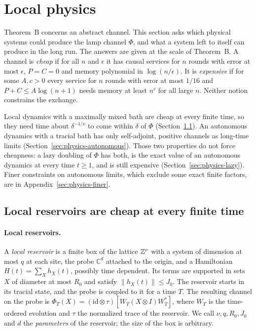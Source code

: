 \section{Local physics}\label{sec:physics}

Theorem~B concerns an abstract channel. This section asks which physical systems could produce the lamp channel $\Phi$, and what a
system left to itself can produce in the long run. The answers are given at the scale of Theorem~B. A channel is \emph{cheap} if for all
$n$ and $\epsilon$ it has causal services for $n$ rounds with error at most $\epsilon$, $P=C=0$ and memory polynomial in $\log(n/\epsilon)$.
It is \emph{expensive} if for some $A,c>0$ every service for $n$ rounds with error at most $1/16$ and $P+C\le A\log(n+1)$ needs memory at
least $n^c$ for all large $n$. Neither notion constrains the exchange.

Local dynamics with a maximally mixed bath are cheap at every finite time, so they need time about $\delta^{-1/\nu}$ to come within
$\delta$ of $\Phi$ (Section~\ref{sec:physics-local}). An autonomous dynamics with a tracial bath has only self-adjoint, positive channels as
long-time limits (Section~\ref{sec:physics-autonomous}). Those two properties do not force cheapness: a lazy doubling of $\Phi$ has both, is
the exact value of an autonomous dynamics at every time $t\ge1$, and is still expensive (Section~\ref{sec:physics-lazy}). Finer constraints
on autonomous limits, which exclude some exact finite factors, are in Appendix~\ref{sec:physics-finer}.

\subsection{Local reservoirs are cheap at every finite time}\label{sec:physics-local}

\paragraph{Local reservoirs.} A \emph{local reservoir} is a finite box of the lattice $\mathbb Z^\nu$ with a system of dimension at most $q$ at each
site, the probe $\mathbb C^d$ attached to the origin, and a Hamiltonian $H(t)=\sum_Xh_X(t)$, possibly time dependent. Its terms are
supported in sets $X$ of diameter at most $R_0$ and satisfy $\|h_X(t)\|\le J_0$. The reservoir starts in its tracial state, and the probe is
coupled to it for a time $T$. The resulting channel on the probe is $\Phi_T(X)=(\mathrm{id}\otimes\tau)[W_T(X\otimes I)W_T^*]$, where $W_T$ is
the time-ordered evolution and $\tau$ the normalized trace of the reservoir. We call $\nu,q,R_0,J_0$ and $d$ the \emph{parameters} of the
reservoir; the size of the box is arbitrary.

